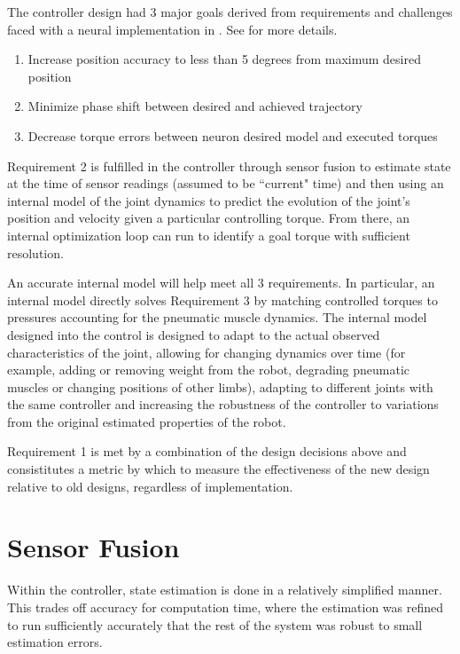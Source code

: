 The controller design had 3 major goals derived from
requirements and challenges faced with a neural implementation in
\cite{HuntPhDThesis}. See  for more details.

\begin{enumerate}
\item Increase position accuracy to less than 5 degrees from maximum desired
position
\item Minimize phase shift between desired and achieved trajectory
\item Decrease torque errors between neuron desired model and executed torques
\end{enumerate}

Requirement 2 is fulfilled in
the controller through sensor fusion to estimate state at the time of sensor
readings (assumed to be ``current" time) and then using an internal model of the
joint dynamics to predict the evolution of the joint's position and velocity
given a particular controlling torque. From there, an internal optimization loop
can run to identify a goal torque with sufficient resolution.

An accurate internal model will help meet all 3 requirements. In particular, an
internal model directly solves Requirement 3 by matching controlled torques to
pressures accounting for the pneumatic muscle dynamics. The internal model
designed into the control is designed to adapt to the actual observed
characteristics of the joint, allowing for changing dynamics over time (for
example, adding or removing weight from the robot, degrading pneumatic muscles
or changing positions of other limbs),
adapting to different joints with the same controller and increasing the
robustness of the controller to variations from the original estimated
properties of the robot.

Requirement 1 is met by a combination of the design decisions above and
consistitutes a metric by which to measure the effectiveness of the new design
relative to old designs, regardless of implementation.

\section{Sensor Fusion}

Within the controller, state estimation is done in a relatively simplified
manner. This trades off accuracy for computation time, where the estimation was
refined to run sufficiently accurately that the rest of the system was robust to
small estimation errors.

